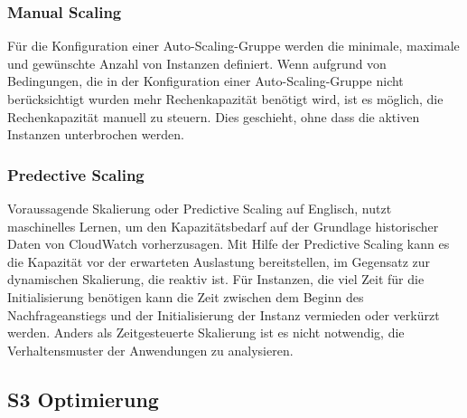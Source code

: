 \subsubsection{Manual Scaling}
Für die Konfiguration einer Auto-Scaling-Gruppe werden die minimale, maximale und gewünschte Anzahl von Instanzen definiert. Wenn aufgrund von Bedingungen, die in der Konfiguration einer Auto-Scaling-Gruppe nicht berücksichtigt wurden mehr Rechenkapazität benötigt wird, ist es möglich, die Rechenkapazität manuell zu steuern. Dies geschieht, ohne dass die aktiven Instanzen unterbrochen werden.

\subsubsection{Predective Scaling}%
Voraussagende Skalierung oder Predictive Scaling auf Englisch, nutzt maschinelles Lernen, um den Kapazitätsbedarf auf der Grundlage historischer Daten von CloudWatch vorherzusagen. Mit Hilfe der Predictive Scaling kann es die Kapazität vor der erwarteten Auslastung bereitstellen, im Gegensatz zur dynamischen Skalierung, die reaktiv ist. 
Für Instanzen, die viel Zeit für die Initialisierung benötigen kann die Zeit zwischen dem Beginn des Nachfrageanstiegs und der Initialisierung der Instanz vermieden oder verkürzt werden.
Anders als Zeitgesteuerte Skalierung ist es nicht notwendig, die Verhaltensmuster der Anwendungen zu analysieren.

\subsection{S3 Optimierung}
